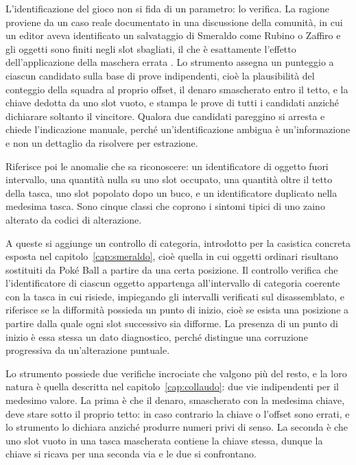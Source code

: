 L'identificazione del gioco non si fida di un parametro: lo verifica. La ragione proviene da un caso reale documentato in una discussione della comunità, in cui un editor aveva identificato un salvataggio di Smeraldo come Rubino o Zaffiro e gli oggetti sono finiti negli slot sbagliati, il che è esattamente l'effetto dell'applicazione della maschera errata \cite{projectpokemon}. Lo strumento assegna un punteggio a ciascun candidato sulla base di prove indipendenti, cioè la plausibilità del conteggio della squadra al proprio offset, il denaro smascherato entro il tetto, e la chiave dedotta da uno slot vuoto, e stampa le prove di tutti i candidati anziché dichiarare soltanto il vincitore. Qualora due candidati pareggino si arresta e chiede l'indicazione manuale, perché un'identificazione ambigua è un'informazione e non un dettaglio da risolvere per estrazione.

Riferisce poi le anomalie che sa riconoscere: un identificatore di oggetto fuori intervallo, una quantità nulla su uno slot occupato, una quantità oltre il tetto della tasca, uno slot popolato dopo un buco, e un identificatore duplicato nella medesima tasca. Sono cinque classi che coprono i sintomi tipici di uno zaino alterato da codici di alterazione.

A queste si aggiunge un controllo di categoria, introdotto per la casistica concreta esposta nel capitolo~\ref{cap:smeraldo}, cioè quella in cui oggetti ordinari risultano sostituiti da Poké Ball a partire da una certa posizione. Il controllo verifica che l'identificatore di ciascun oggetto appartenga all'intervallo di categoria coerente con la tasca in cui risiede, impiegando gli intervalli verificati sul disassemblato, e riferisce se la difformità possieda un punto di inizio, cioè se esista una posizione a partire dalla quale ogni slot successivo sia difforme. La presenza di un punto di inizio è essa stessa un dato diagnostico, perché distingue una corruzione progressiva da un'alterazione puntuale.

Lo strumento possiede due verifiche incrociate che valgono più del resto, e la loro natura è quella descritta nel capitolo~\ref{cap:collaudo}: due vie indipendenti per il medesimo valore. La prima è che il denaro, smascherato con la medesima chiave, deve stare sotto il proprio tetto: in caso contrario la chiave o l'offset sono errati, e lo strumento lo dichiara anziché produrre numeri privi di senso. La seconda è che uno slot vuoto in una tasca mascherata contiene la chiave stessa, dunque la chiave si ricava per una seconda via e le due si confrontano.

